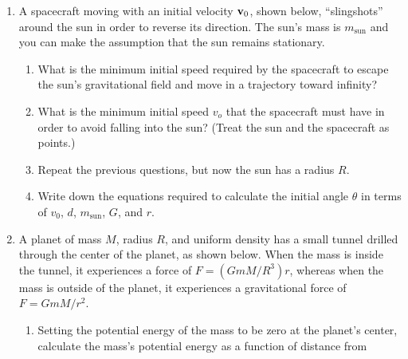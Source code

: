 \documentclass{../../oss-apphys}
\begin{document}
\begin{enumerate}[leftmargin=15pt]
  
\item A spacecraft moving with an initial velocity $\mathbf{v}_0$, shown below,
  ``slingshots'' around the sun in order to reverse its direction. The sun's
  mass is $m_\mathrm{sun}$ and you can make the assumption that the sun remains
  stationary.\\
  \begin{minipage}{0.28\textwidth}
  \end{minipage}
  \begin{minipage}{0.7\textwidth}
    \begin{enumerate}[noitemsep]
    \item What is the minimum initial speed required by the spacecraft to escape
      the sun's gravitational field and move in a trajectory toward infinity?
    \item What is the minimum initial speed $v_o$ that the spacecraft must have
      in order to avoid falling into the sun? (Treat the sun and the spacecraft
      as points.)
    \item Repeat the previous questions, but now the sun has a radius $R$.
    \item Write down the equations required to calculate the initial angle
      $\theta$ in terms of $v_0$, $d$, $m_\mathrm{sun}$, $G$, and $r$.
    \end{enumerate}
  \end{minipage}
  \newpage
\item A planet of mass $M$, radius $R$, and uniform density has a small tunnel
  drilled through the center of the planet, as shown below. When the mass is
  inside the tunnel, it experiences a force of $F=(GmM/R^3)r$, whereas when the
  mass is outside of the planet, it experiences a gravitational force of
  $F=GmM/r^2$.
  \begin{center}
  \end{center}
  \begin{enumerate}[noitemsep,leftmargin=20pt]
  \item Setting the potential energy of the mass to be zero at the planet's
    center, calculate the mass's potential energy as a function of distance from

\end{enumerate}
\end{enumerate}
\end{document}

